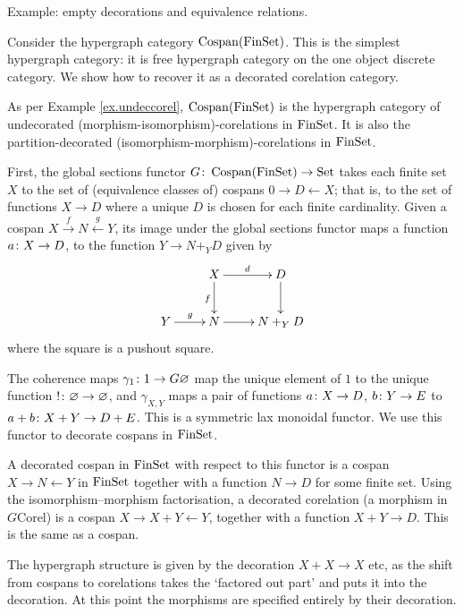 \begin{example}
  Example: empty decorations and equivalence relations. 
  
  Consider the hypergraph category $\operatorname{{Cospan}}(\mathrm{FinSet})$. This is the simplest
  hypergraph category: it is free hypergraph category on the one object discrete
  category. We show how to recover it as a decorated corelation category.

  As per Example \ref{ex.undeccorel}, $\operatorname{{Cospan}}(\mathrm{FinSet})$ is the hypergraph
  category of undecorated (morphism-isomorphism)-corelations in $\mathrm{FinSet}$. It is
  also the partition-decorated (isomorphism-morphism)-corelations in $\mathrm{FinSet}$.   
  
  First, the global sections functor $G{\colon} \operatorname{{Cospan}}(\mathrm{FinSet}) \to \mathrm{Set}$ takes
  each finite set $X$ to the set of (equivalence classes of) cospans $0 \to D
  \leftarrow X$; that is, to the set of functions $X \to D$ where a unique $D$
  is chosen for each finite cardinality. Given a cospan $X \stackrel{f}\to N
  \stackrel{g}\leftarrow Y$, its image under the global sections functor maps a
  function $a{\colon} X \to D$, to the function $Y \to N+_YD$ given by
  \[
    \xymatrix{
      & X \ar[r]^d \ar[d]_f & D \ar[d] \\
      Y \ar[r]^g  & N \ar[r] & N+_YD
    }
  \]
  where the square is a pushout square.

  The coherence maps $\gamma_1{\colon} 1 \to G\varnothing$ map the unique element
  of $1$ to the unique function $!{\colon} \varnothing \to \varnothing$, and
  $\gamma_{X,Y}$ maps a pair of functions $a{\colon} X \to D$, $b{\colon} Y \to E$ to
  $a+b{\colon} X+Y \to D+E$. This is a symmetric lax monoidal functor. We use this
  functor to decorate cospans in $\mathrm{FinSet}$. 

  A decorated cospan in $\mathrm{FinSet}$ with respect to this functor is a cospan $X
  \to N \leftarrow Y$ in $\mathrm{FinSet}$ together with a function $N \to D$ for some
  finite set. Using the isomorphism--morphism factorisation, a decorated
  corelation (a morphism in $G\mathrm{Corel}$) is a
  cospan $X \to X+Y \leftarrow Y$, together with a function $X+Y \to D$.
  This is the same as a cospan. 

  The hypergraph structure is given by the decoration $X+X \to X$ etc, as the
  shift from cospans to corelations takes the `factored out part' and puts it
  into the decoration. At this point the morphisms are specified entirely by
  their decoration.


\end{example}
